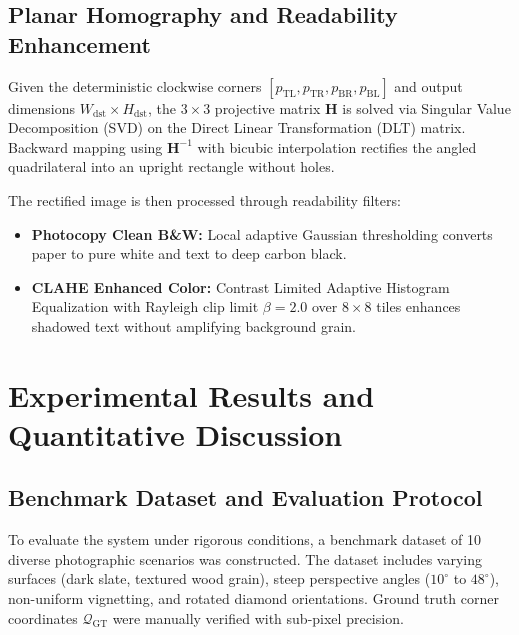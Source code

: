 \documentclass[11pt,a4paper]{article}
\begin{document}
\subsection{Planar Homography and Readability Enhancement}
Given the deterministic clockwise corners $[p_{\text{TL}}, p_{\text{TR}}, p_{\text{BR}}, p_{\text{BL}}]$ and output dimensions $W_{\text{dst}} \times H_{\text{dst}}$, the $3 \times 3$ projective matrix $\mathbf{H}$ is solved via Singular Value Decomposition (SVD) on the Direct Linear Transformation (DLT) matrix. Backward mapping using $\mathbf{H}^{-1}$ with bicubic interpolation rectifies the angled quadrilateral into an upright rectangle without holes.

The rectified image is then processed through readability filters:
\begin{itemize}[leftmargin=1.5em,itemsep=0.15em]
    \item \textbf{Photocopy Clean B\&W:} Local adaptive Gaussian thresholding converts paper to pure white and text to deep carbon black.
    \item \textbf{CLAHE Enhanced Color:} Contrast Limited Adaptive Histogram Equalization with Rayleigh clip limit $\beta = 2.0$ over $8 \times 8$ tiles enhances shadowed text without amplifying background grain.
\end{itemize}

\newpage
\section{Experimental Results and Quantitative Discussion}
\label{sec:results}

\subsection{Benchmark Dataset and Evaluation Protocol}
To evaluate the system under rigorous conditions, a benchmark dataset of 10 diverse photographic scenarios was constructed. The dataset includes varying surfaces (dark slate, textured wood grain), steep perspective angles ($10^\circ$ to $48^\circ$), non-uniform vignetting, and rotated diamond orientations. Ground truth corner coordinates $\mathcal{Q}_{\text{GT}}$ were manually verified with sub-pixel precision.
\end{document}
